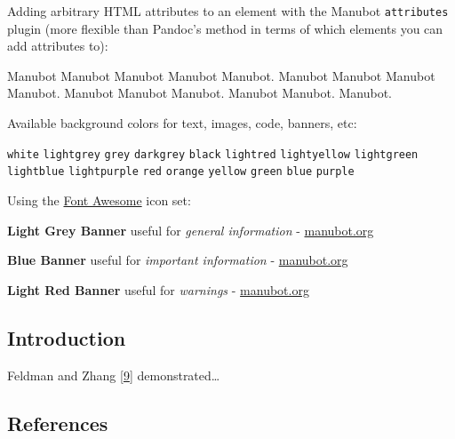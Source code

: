 \documentclass[
]{article}
\begin{document}
Adding arbitrary HTML attributes to an element with the Manubot \texttt{attributes} plugin (more flexible than Pandoc's method in terms of which elements you can add attributes to):

Manubot Manubot Manubot Manubot Manubot.
Manubot Manubot Manubot Manubot.
Manubot Manubot Manubot.
Manubot Manubot.
Manubot.

Available background colors for text, images, code, banners, etc:

\texttt{white}
\texttt{lightgrey}
\texttt{grey}
\texttt{darkgrey}
\texttt{black}
\texttt{lightred}
\texttt{lightyellow}
\texttt{lightgreen}
\texttt{lightblue}
\texttt{lightpurple}
\texttt{red}
\texttt{orange}
\texttt{yellow}
\texttt{green}
\texttt{blue}
\texttt{purple}

Using the \href{https://fontawesome.com/}{Font Awesome} icon set:

{ \textbf{Light Grey Banner}
useful for \emph{general information} - \href{https://manubot.org/}{manubot.org}}

{ \textbf{Blue Banner}
useful for \emph{important information} - \href{https://manubot.org/}{manubot.org}}

{ \textbf{Light Red Banner}
useful for \emph{warnings} - \href{https://manubot.org/}{manubot.org}}

\hypertarget{introduction}{%
\subsection{Introduction}\label{introduction}}

Feldman and Zhang {[}\protect\hyperlink{ref-Y4JFfN9O}{9}{]} demonstrated\ldots{}

\hypertarget{references}{%
\subsection{References}\label{references}}
\end{document}
